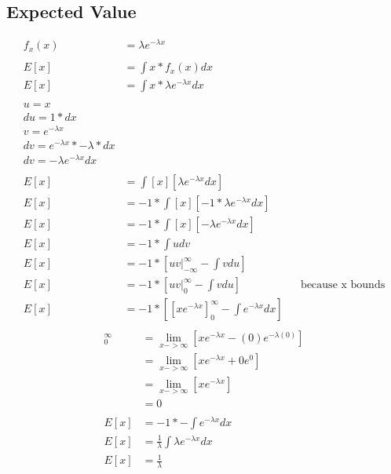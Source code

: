 \documentclass[]{book}
\begin{document}
\subsection{Expected Value}
\begin{align*}
f_x(x) &= \lambda e^{-\lambda x}\\
\\
E[x] &= \int {x*f_x(x)dx}\\
E[x] &= \int {x*\lambda e^{-\lambda x}dx}\\
\\
	u = x\\
	du = 1*dx\\
	v = e^{-\lambda x}\\
	dv = e^{-\lambda x}*-\lambda * dx\\
	dv = -\lambda e^{-\lambda x}dx\\
	\\
E[x] &= \int {[x] [\lambda e^{-\lambda x}dx]}\\
E[x] &= -1*\int {[x] [-1* \lambda e^{-\lambda x}dx]}\\
E[x] &= -1*\int {[x] [-\lambda e^{-\lambda x}dx]}\\
E[x] &= -1*\int {udv}\\
E[x] &= -1*[uv|_{-\infty}^{\infty} - \int {vdu}]\\
E[x] &= -1*[uv|_{0}^{\infty} - \int {vdu}] && \text{because x bounds}\\
E[x] &= -1*[[xe^{-\lambda x}]_{0}^{\infty} - \int {e^{-\lambda x}dx}]\\
\end{align*}
\begin{align*}
[xe^{-\lambda x}]_{0}^{\infty} &= \lim_{x->\infty}{[xe^{-\lambda x} - (0)e^{-\lambda (0)}]}\\
&= \lim_{x->\infty}{[xe^{-\lambda x} + 0e^{0}]}\\
&= \lim_{x->\infty}{[xe^{-\lambda x}]}\\
&= 0\\
\\
E[x] &= -1 * - \int {e^{-\lambda x}dx}\\
E[x] &= \frac{1}{\lambda} \int {\lambda e^{-\lambda x}dx}\\
E[x] &= \frac{1}{\lambda}\\
\end{align*}
\end{document}

